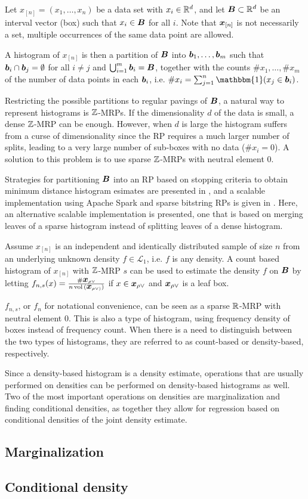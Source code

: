 \documentclass[../mapped-regular-pavings.tex]{subfiles}
\begin{document}
  
  Let $x_{[n]} = (x_1, \dots, x_n)$ be a data set with $x_i \in \mathbb{R}^d$,
  and let $\B \subset \Rz^d$ be an interval vector (box) such that $x_i \in \B$ for all $i$.
  Note that $\x_{[n]}$ is not necessarily a set,
  multiple occurrences of the same data point are allowed.

  A histogram of $x_{[n]}$ is then a partition of $\B$ into $\b_1, \dots, \b_m$ such that
  $\b_i \cap \b_j = \emptyset$ for all $i \neq j$ and
  $\bigcup_{i = 1}^m \b_i = \B$,
  together with the counts $\#x_1, \dots, \#x_m$ of the number of data points in each $\b_i$,
  i.e. $\#x_i = \sum_{j=1}^n \mathbbm{1}(x_j \in \b_i)$.

  Restricting the possible partitions to regular pavings of $\B$,
  a natural way to represent histograms is $\mathbb{Z}$-MRPs.
  If the dimensionality $d$ of the data is small,
  a dense $\mathbb{Z}$-MRP can be enough.
  However, when $d$ is large the histogram suffers from a curse of dimensionality since
  the RP requires a much larger number of splits,
  leading to a very large number of sub-boxes with no data ($\#x_i = 0$).
  A solution to this problem is to use sparse $\mathbb{Z}$-MRPs with neutral element 0.

  Strategies for partitioning $\B$ into an RP based on stopping criteria 
  to obtain minimum distance histogram esimates are 
  presented in \cite{srp-mde-raaz-teng}, and 
  a scalable implementation using Apache Spark and sparse bitstring RPs is 
  given in \cite{scala-density-tree}.
  Here, an alternative scalable implementation is presented,
  one that is based on merging leaves of a sparse histogram instead
  of splitting leaves of a dense histogram.

  Assume $x_{[n]}$ is an independent and identically distributed sample of size $n$ from 
  an underlying unknown density $f \in \mathcal{L}_1$, i.e. $f$ is any density.
  A count based histogram of $x_{[n]}$ with 
  $\mathbb{Z}$-MRP $s$ can be used to estimate the density $f$ on $\B$ by
  letting 
  $f_{n, s}(x) = \frac{\#\x_{\rho \vee}}{n \, \vol (\x_{\rho \vee)})}$ if 
  $x \in \x_{\rho \vee}$ and $\x_{\rho \vee}$ is a leaf box.

  $f_{n, s}$, or $f_n$ for notational convenience, 
  can be seen as a sparse $\mathbb{R}$-MRP with neutral element $0$.
  This is also a type of histogram, 
  using frequency density of boxes instead of frequency count.
  When there is a need to distinguish between the two types of histograms,
  they are referred to as count-based or density-based, respectively.

  Since a density-based histogram is a density estimate,
  operations that are usually performed on densities can
  be performed on density-based histograms as well.
  Two of the most important operations on densities are
  marginalization and finding conditional densities, 
  as together they allow for regression based on 
  conditional densities of the joint density estimate.

  \subsection{Marginalization}
    

  \subsection{Conditional density}
    
\end{document}
